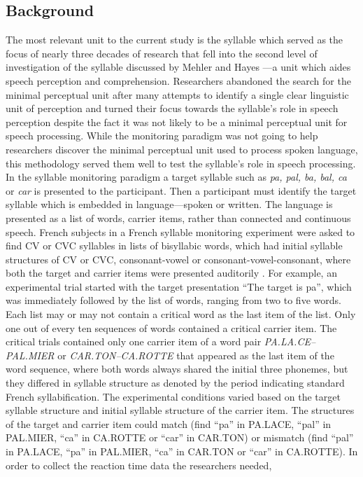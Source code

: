 \documentclass[
12pt, %
english, %
doublespacing, %
nolistspacing, %
liststotoc, %
headsepline, %
chapterinoneline, %
openany, %
]{DoctoralThesis}\usepackage[]{graphicx}\usepackage[]{color}
\begin{document}

\subsection{Background}
The most relevant unit to the current study is the syllable which served as the focus of nearly three decades of research that fell into the second level of investigation of the syllable discussed by Mehler and Hayes \parencite*{Mehler1981-wp}---a unit which aides speech perception and comprehension. Researchers abandoned the search for the minimal perceptual unit after many attempts to identify a single clear linguistic unit of perception and turned their focus towards the syllable’s role in speech perception despite the fact it was not likely to be a minimal perceptual unit for speech processing. While the monitoring paradigm was not going to help researchers discover the minimal perceptual unit used to process spoken language, this methodology served them well to test the syllable’s role in speech processing. In the syllable monitoring paradigm a target syllable such as \emph{pa, pal, ba, bal, ca} or \emph{car} is presented to the participant. Then a participant must identify the target syllable which is embedded in language---spoken or written. The language is presented as a list of words, carrier items, rather than connected and continuous speech. French subjects in a French syllable monitoring experiment were asked to find CV or CVC syllables in lists of bisyllabic words, which had initial syllable structures of CV or CVC, consonant-vowel or consonant-vowel-consonant, where both the target and carrier items were presented auditorily \parencite{Mehler1981-vi}. For example, an experimental trial started with the target presentation “The target is pa”, which was immediately followed by the list of words, ranging from two to five words. Each list may or may not contain a critical word as the last item of the list. Only one out of every ten sequences of words contained a critical carrier item. The critical trials contained only one carrier item of a word pair \emph{PA.LA.CE–PAL.MIER} or \emph{CAR.TON–CA.ROTTE} that appeared as the last item of the word sequence, where both words always shared the initial three phonemes, but they differed in syllable structure as denoted by the period indicating standard French syllabification. The experimental conditions varied based on the target syllable structure and initial syllable structure of the carrier item. The structures of the target and carrier item could match (find “pa” in PA.LACE, “pal” in PAL.MIER, “ca” in CA.ROTTE or “car” in CAR.TON) or mismatch (find “pal” in PA.LACE, “pa” in PAL.MIER, “ca” in CAR.TON or “car” in CA.ROTTE). In order to collect the reaction time data the researchers needed, 
\end{document}
